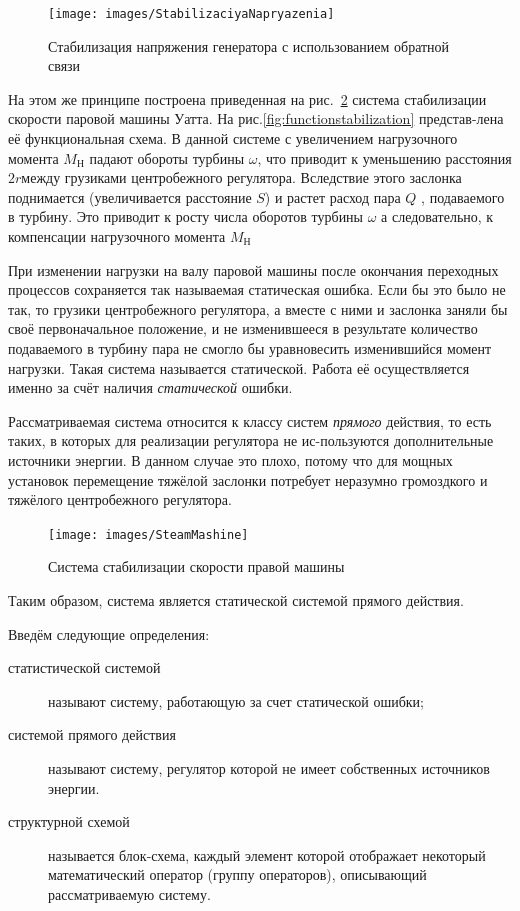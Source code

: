 \begin{figure}[h]
	\centering
	\texttt{[image: images/StabilizaciyaNapryazenia]}
	\caption{Стабилизация напряжения генератора с использованием обратной связи}
	\label{fig:stabilizaciyanapryazenia}
\end{figure}

На этом же принципе построена приведенная на рис.~\ref{fig:steammashine} система стабилизации скорости паровой машины Уатта. На рис.\ref{fig:functionstabilization} представ-лена её функциональная схема. В данной системе с увеличением нагрузочного момента $ M_{Н} $ падают обороты турбины $ \omega $, что приводит к уменьшению расстояния $ 2r $между грузиками центробежного регулятора. Вследствие этого заслонка поднимается (увеличивается расстояние $ S $) и растет расход пара $ Q $ , подаваемого в турбину. Это приводит к росту числа оборотов турбины $ \omega $ а следовательно, к компенсации нагрузочного момента $ M_{Н} $

При изменении нагрузки на валу паровой машины после окончания переходных процессов сохраняется так называемая статическая ошибка. Если бы это было не так, то грузики центробежного регулятора, а вместе с ними и заслонка заняли бы своё первоначальное положение, и не изменившееся в результате количество подаваемого в турбину пара не смогло бы уравновесить изменившийся момент нагрузки. Такая система называется статической. Работа её осуществляется именно за счёт наличия \textit{статической} ошибки. 

Рассматриваемая система относится к классу систем \textit{прямого} действия, то есть таких, в которых для реализации регулятора не ис-пользуются дополнительные источники энергии. В данном случае это плохо, потому что для мощных установок перемещение тяжёлой заслонки потребует неразумно громоздкого и тяжёлого центробежного регулятора.

\begin{figure}[h!]
	\centering
	\texttt{[image: images/SteamMashine]}
	\caption{Система стабилизации скорости правой машины }
	\label{fig:steammashine}
\end{figure}

Таким образом, система является статической системой прямого действия.

Введём следующие определения:
\begin{description}
	\item[статистической системой] называют систему, работающую за счет статической ошибки;
	\item[системой прямого действия] называют систему, регулятор которой не имеет собственных источников энергии.
	\item[структурной схемой] называется блок-схема, каждый элемент которой отображает некоторый математический оператор (группу операторов), описывающий рассматриваемую систему.
\end{description}

